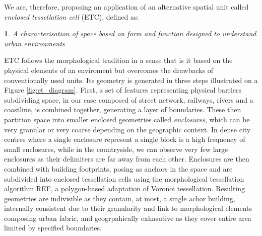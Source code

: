 We are, therefore, proposing an application of an alternative spatial unit called \textit{enclosed
tessellation cell} (ETC), defined as:

\newtheorem*{theorem}{}
\begin{theorem}
    A characterisation of space based on form and function designed to understand urban
environments
\end{theorem}


ETC follows the morphological tradition in a sense that is it
based on the physical elements of an enviroment but overcomes the drawbacks of
conventionally used units. Its geometry is generated in three steps illustrated on a
Figure \ref{fig:et_diagram}. First, a set of features representing physical barriers
subdividing space, in our case composed of street network, railways, rivers and a
coastline, is combined together, generating a layer of boundaries. These then partition space
into smaller enclosed geometries called \textit{enclosures}, which can be very granular
or very coarse depending on the geographic context. In dense city centres where a single
enclosure represent a single block is a high frequency of small enclosures, while in the
countryside, we can observe very few large enclosures as their delimiters are far away
from each other. Enclosures are then combined with building footprints, posing as
anchors in the space and are subdivided into enclosed tessellation cells using the
morphological tessellation algorithm REF, a polygon-based adaptation of Voronoi
tessellation. Resulting geometries are indivisible as they contain, at most, a single
achor building, internally consistent due to their granularity and link to morphological
elements composing urban fabric, and geogrpahically exhasutive as they cover entire area
limited by specified boundaries.


